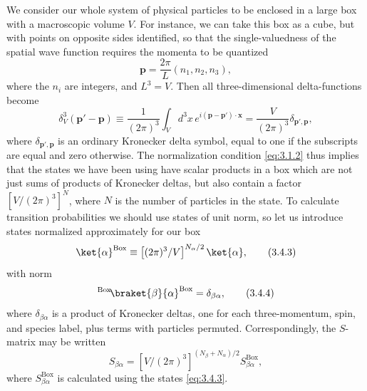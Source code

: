 We consider our whole system of physical particles to be enclosed in a large box with a
macroscopic volume $V$. For instance, we can take this box as a cube, but with points on
opposite sides identified, so that the single-valuedness of the spatial wave function requires
the momenta to be quantized
\begin{equation}
 \mathbf{p}=\frac{2\pi}{L}(n_1,n_2,n_3),
 \tag{3.4.1}\label{eq:3.4.1}
\end{equation}
where the $n_i$ are integers, and $L^3=V$. Then all three-dimensional delta-functions become
\begin{equation}
 \delta_V^3(\mathbf{p}'-\mathbf{p})\equiv
 \frac{1}{(2\pi)^3}\int_V d^3x\,e^{i(\mathbf{p}-\mathbf{p}')\cdot\mathbf{x}}
 =\frac{V}{(2\pi)^3}\delta_{\mathbf{p}',\mathbf{p}},
 \tag{3.4.2}\label{eq:3.4.2}
\end{equation}
where $\delta_{\mathbf{p}',\mathbf{p}}$ is an ordinary Kronecker delta symbol, equal to one if the
subscripts are equal and zero otherwise. The normalization condition \eqref{eq:3.1.2} thus implies
that the states we have been using have scalar products in a box which are not just sums of
products of Kronecker deltas, but also contain a factor $[V/(2\pi)^3]^N$, where $N$ is the
number of particles in the state. To calculate transition probabilities we should use states
of unit norm, so let us introduce states normalized approximately for our box
\begin{equation}
 \ket{\alpha}^{\mathrm{Box}}\equiv
 \left[(2\pi)^3/V\right]^{N_\alpha/2}\ket{\alpha},
 \tag{3.4.3}\label{eq:3.4.3}
\end{equation}
with norm
\begin{equation}
 {}^{\mathrm{Box}}\!\braket{\beta}{\alpha}^{\mathrm{Box}}=\delta_{\beta\alpha},
 \tag{3.4.4}\label{eq:3.4.4}
\end{equation}
where $\delta_{\beta\alpha}$ is a product of Kronecker deltas, one for each three-momentum,
spin, and species label, plus terms with particles permuted. Correspondingly, the $S$-matrix
may be written
\begin{equation}
 S_{\beta\alpha}=\left[V/(2\pi)^3\right]^{(N_\beta+N_\alpha)/2}
 S^{\mathrm{Box}}_{\beta\alpha},
 \tag{3.4.5}\label{eq:3.4.5}
\end{equation}
where $S^{\mathrm{Box}}_{\beta\alpha}$ is calculated using the states \eqref{eq:3.4.3}.

